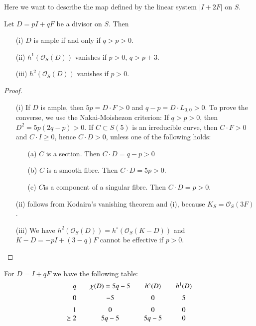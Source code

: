 Here we want to describe the map defined by the linear system $|I+2F|$
on $S$.

\begin{proposition}\label{chap2-prop8}
Let $D=pI+qF$ be a divisor on $S$. Then
\begin{itemize}
\item[\rm(i)] $D$ is ample if and only if $q>p>0$.

\item[\rm(ii)] $h^{1}(\mathscr{O}_{S}(D))$ vanishes if $p>0$, $q>p+3$.

\item[\rm(iii)] $h^{2}(\mathscr{O}_{S}(D))$ vanishes if $p>0$.
\end{itemize}
\end{proposition}

\begin{proof}
\begin{itemize}
\item[(i)] If $D$ is ample, then $5p=D\cdot F>0$ and $q-p=D\cdot
L_{0,0}>0$. To prove the converse, we use the Nakai-Moishezon
criterion: If $q>p>0$, then $D^{2}=5p(2q-p)>0$. If $C\subset S(5)$ is
an irreducible curve, then $C\cdot F>0$ and $C\cdot I\geq 0$, hence
$C\cdot D>0$, unless one of the following holds:
\begin{itemize}
\item[(a)] $C$ is a section. Then $C\cdot D=q-p>0$

\item[(b)] $C$ is a smooth fibre. Then $C\cdot D=5p>0$.

\item[(c)] $C$\pageoriginale is a component of a singular fibre. Then
$C\cdot D=p>0$.
\end{itemize}
\item[(ii)] follows from Kodaira's vanishing theorem and (i), because
$K_{S}=\mathscr{O}_{S}(3F)$. 

\item[(iii)] We have
$h^{2}(\mathscr{O}_{S}(D))=h^{\circ}(\mathscr{O}_{S}(K-D))$ and
$K-D=-pI+(3-q)F$ cannot be effective if $p>0$.
\end{itemize}
\end{proof}

\begin{lemma}\label{chap2-lem11}
For $D=I+qF$ we have the following table:
$$
\begin{array}{r@{\;}c@{\qquad}c@{\qquad}c@{\qquad}c}
& q & \chi(D)=5q-5 & h^{\circ}(D) & h^{1}(D)\\[5pt]
& 0 & -5 & 0 & 5\\[5pt]
&1 & 0 & 0 & 0\\
\geq & 2 & 5q-5 & 5q-5 & 0
\end{array}
$$
\end{lemma}

